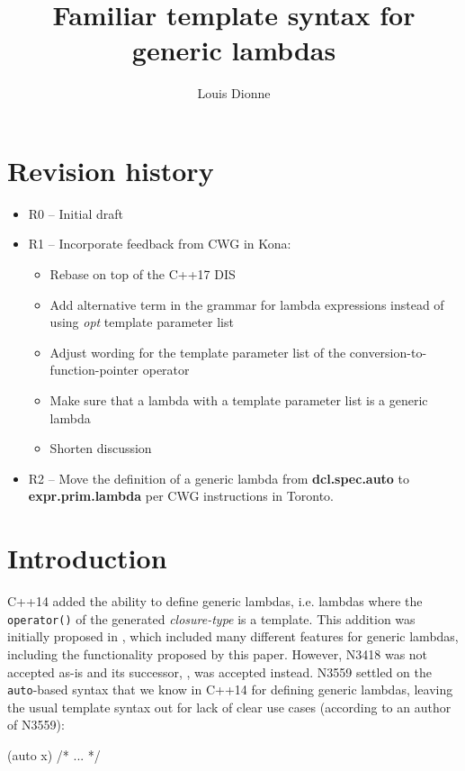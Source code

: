 \documentclass{wg21}
\title{Familiar template syntax for generic lambdas}
\author{Louis Dionne}{ldionne.2@gmail.com}
\newcommand{\cc}[1]{\texttt{#1}}
\begin{document}
\maketitle


\section{Revision history}
\begin{itemize}
  \item R0 -- Initial draft
  \item R1 -- Incorporate feedback from CWG in Kona:
              \begin{itemize}
                \item Rebase on top of the C++17 DIS
                \item Add alternative term in the grammar for lambda expressions
                      instead of using \textit{opt} template parameter list
                \item Adjust wording for the template parameter list of the
                      conversion-to-function-pointer operator
                \item Make sure that a lambda with a template parameter list
                      is a generic lambda
                \item Shorten discussion
              \end{itemize}
  \item R2 -- Move the definition of a generic lambda from \textbf{dcl.spec.auto}
              to \textbf{expr.prim.lambda} per CWG instructions in Toronto.
\end{itemize}


\section{Introduction}
C++14 added the ability to define generic lambdas, i.e. lambdas where the
\cc{operator()} of the generated \textit{closure-type} is a template. This
addition was initially proposed in \cite{N3418}, which included many different
features for generic lambdas, including the functionality proposed by this
paper. However, N3418 was not accepted as-is and its successor,
\cite{N3559}, was accepted instead. N3559 settled on the \cc{auto}-based
syntax that we know in C++14 for defining generic lambdas, leaving the
usual template syntax out for lack of clear use cases (according to an author
of N3559):

\begin{cpp}
[](auto x) { /* ... */ }
\end{cpp}
\end{document}

